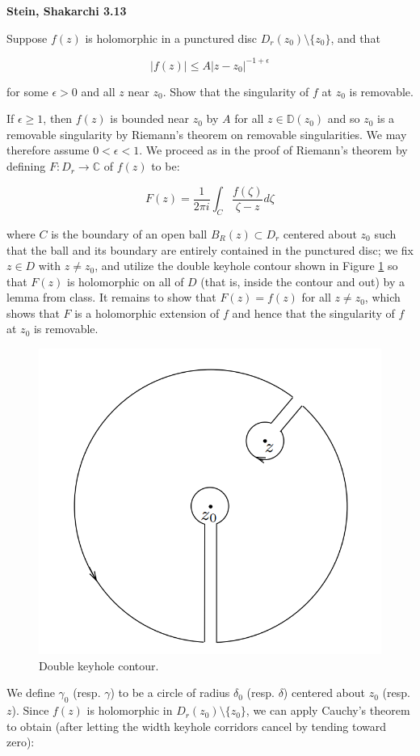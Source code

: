 \textbf{Stein, Shakarchi 3.13}

Suppose $f(z)$ is holomorphic in a punctured disc $D_r(z_0) \setminus \{z_0\}$, and that

$$
|f(z)| \le A|z - z_0|^{-1 + \epsilon}
$$

for some $\epsilon > 0$ and all $z$ near $z_0$. Show that the singularity of $f$ at $z_0$ is removable.

\begin{solution}
  If $\epsilon \ge 1$, then $f(z)$ is bounded near $z_0$ by $A$ for all $z \in \mathbb{D}(z_0)$ and so $z_0$ is a 
  removable singularity by Riemann's theorem on removable singularities. We may therefore assume $0 < \epsilon < 1$.
  We proceed as in the proof of Riemann's theorem by defining $F: D_r \to \mathbb{C}$ of $f(z)$ to be:

  $$
  F(z) = \frac{1}{2 \pi i} \int_C \frac{f(\zeta)}{\zeta - z} d\zeta
  $$

  where $C$ is the boundary of an open ball $B_R(z) \subset D_r$ centered about $z_0$ such that the ball and its 
  boundary are entirely contained in the punctured disc; we fix $z \in D$ with $z \neq z_0$, and utilize the double 
  keyhole contour shown in Figure \ref{fig:double_keyhole_contour} so that $F(z)$ is holomorphic on all of $D$ (that is, 
  inside the contour and out) by a lemma from class. It remains to show that $F(z) = f(z)$ for all $z \neq z_0$, which 
  shows that $F$ is a holomorphic extension of $f$ and hence that the singularity of $f$ at $z_0$ is removable. 

  \begin{figure}[h]
    \centering
    \includegraphics[width=0.4 \textwidth]{problem_7.png}
    \caption{Double keyhole contour.}
    \label{fig:double_keyhole_contour}
  \end{figure}

  We define $\gamma_0$ (resp. $\gamma$) to be a circle of radius $\delta_0$ (resp. $\delta$) centered about $z_0$ 
  (resp. $z$). Since $f(z)$ is holomorphic 
  in $D_r(z_0) \setminus \{z_0\}$, we can apply Cauchy's theorem to obtain (after letting the width keyhole corridors 
  cancel by tending toward zero):


\end{solution}

